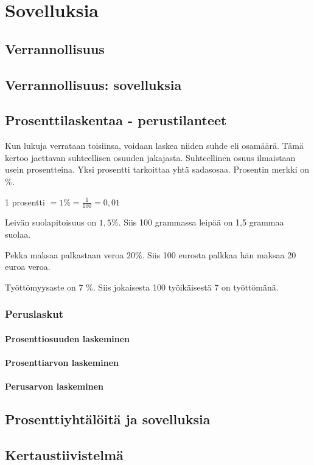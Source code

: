 %
\part{Sovelluksia}
%
%
\chapter{Verrannollisuus}
\chapter{Verrannollisuus: sovelluksia}
\chapter{Prosenttilaskentaa - perustilanteet}
Kun lukuja verrataan toisiinsa, voidaan laskea niiden suhde eli osamäärä. Tämä kertoo jaettavan suhteellisen osuuden jakajasta. Suhteellinen osuus ilmaistaan usein prosentteina. Yksi prosentti tarkoittaa yhtä sadasosaa. Prosentin merkki on \%.

1 prosentti $= 1 \% = \frac{1}{100} = 0,01$

Leivän suolapitoisuus on $1,5 \%$. Siis 100 grammassa leipää on 1,5 grammaa suolaa.

Pekka maksaa palkastaan veroa $20 \%$. Siis 100 eurosta palkkaa hän maksaa 20 euroa veroa.

Työttömyysaste on 7 \%. Siis jokaisesta 100 työikäisestä 7 on työttömänä.

\section{Peruslaskut}

\subsection{Prosenttiosuuden laskeminen}

\subsection{Prosenttiarvon laskeminen}

\subsection{Perusarvon laskeminen}

\chapter{Prosenttiyhtälöitä ja sovelluksia}
%
%
\chapter{Kertaustiivistelmä}
